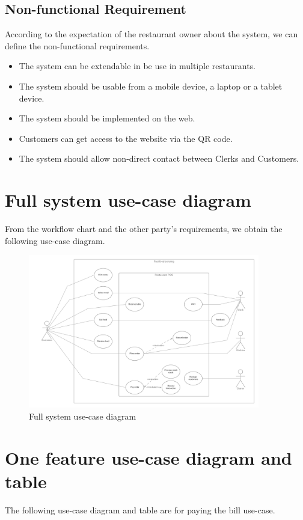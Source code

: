 \documentclass[a4paper]{article}
\numberwithin{equation}{section}
\begin{document}
\subsection{Non-functional Requirement}
According to the expectation of the restaurant owner about the system, we can define the non-functional requirements.
\begin{itemize}
  \item The system can be extendable in be use in multiple restaurants.
  \item The system should be usable from a mobile device, a laptop or a tablet device.
  \item The system should be implemented on the web.
  \item Customers can get access to the website via the QR code.
  \item The system should allow non-direct contact between Clerks and Customers.
\end{itemize}

\section{Full system use-case diagram}
From the workflow chart and the other party's requirements, we obtain the following use-case diagram.

\begin{figure}[H]
  \centering
  \includegraphics[width=0.9\textwidth]{PieceOfSale.png}
  \caption{Full system use-case diagram}
\end{figure}

\section{One feature use-case diagram and table}
The following use-case diagram and table are for paying the bill use-case.
\end{document}
